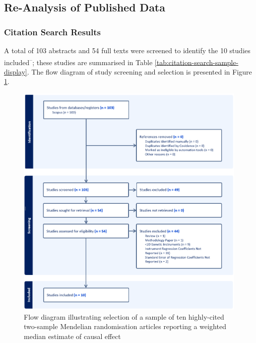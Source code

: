 \documentclass[
]{article}
\begin{document}
\newpage

\subsection{Re-Analysis of Published Data}\label{re-analysis-of-published-data-1}

\subsubsection{Citation Search Results}\label{citation-search-results}

A total of 103 abstracts and 54 full texts were screened to identify the 10 studies included\textsuperscript{--}; these studies are summarised in Table \ref{tab:citation-search-sample-display}. The flow diagram of study screening and selection is presented in Figure \ref{fig:screening-flow}.

\begin{figure}
\includegraphics[width=1\linewidth,height=0.7\textheight]{Data/Citations_Search/WME_citation_search_flow_diagram_crop} \caption{Flow diagram illustrating selection of a sample of ten highly-cited two-sample Mendelian randomisation articles reporting a weighted median estimate of causal effect}\label{fig:screening-flow}
\end{figure}
\end{document}
